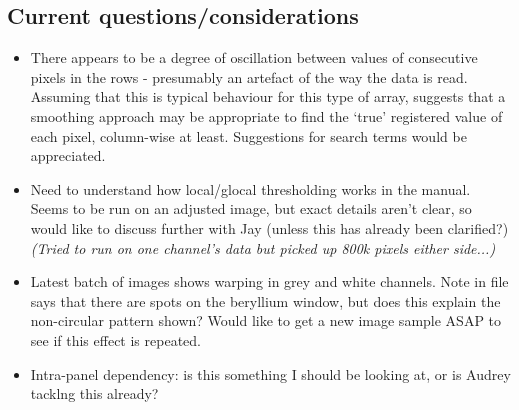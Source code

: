 \documentclass[10pt,fleqn]{article}
\begin{document}
\subsection*{Current questions/considerations}
\begin{itemize}

\item There appears to be a degree of oscillation between values of consecutive pixels in the rows - presumably an artefact of the way the data is read. Assuming that this is typical behaviour for this type of array, suggests that a smoothing approach may be appropriate to find the `true' registered value of each pixel, column-wise at least. Suggestions for search terms would be appreciated.

\item Need to understand how local/glocal thresholding works in the manual. Seems to be run on an adjusted image, but exact details aren't clear, so would like to discuss further with Jay (unless this has already been clarified?) \textit{(Tried to run on one channel's data but picked up 800k pixels either side...)}

\item Latest batch of images shows warping in grey and white channels. Note in file says that there are spots on the beryllium window, but does this explain the non-circular pattern shown? Would like to get a new image sample ASAP to see if this effect is repeated.




\item Intra-panel dependency: is this something I should be looking at, or is Audrey tacklng this already?
\end{itemize}
\end{document}
